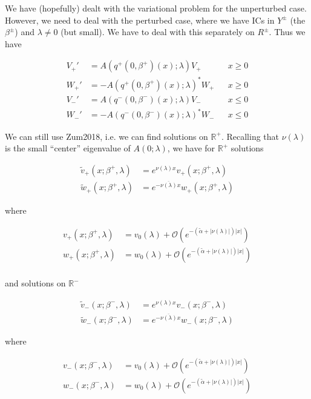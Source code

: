 \documentclass[12pt]{article}
\def\R{{\mathbb R}}
\begin{document}
We have (hopefully) dealt with the variational problem for the unperturbed case. However, we need to deal with the perturbed case, where we have ICs in $Y^\pm$ (the $\beta^\pm$) and $\lambda \neq 0$ (but small). We have to deal with this separately on $R^\pm$. Thus we have

\begin{align}
V_+' &= A(q^+(0, \beta^+)(x); \lambda) V_+ && x \geq 0 \label{eig:V+} \\
W_+' &= -A(q^+(0, \beta^+)(x); \lambda)^* W_+ && x \geq 0\label{eig:W+} \\
V_-' &= A(q^-(0, \beta^-)(x); \lambda) V_- && x \leq 0 \label{eig:V-} \\
W_-' &= -A(q^-(0, \beta^-)(x); \lambda)^* W_- && x \leq 0 \label{eig:W-}
\end{align}

We can still use Zum2018, i.e. we can find solutions on $\R^+$. Recalling that $\nu(\lambda)$ is the small ``center'' eigenvalue of $A(0; \lambda)$, we have for $\R^+$ solutions

\begin{align}
\tilde{v}_+(x; \beta^+, \lambda) &= e^{\nu(\lambda) x } v_+(x; \beta^+, \lambda) \label{tildev+} \\
\tilde{w}_+(x; \beta^+, \lambda) &= e^{-\overline{\nu(\lambda)} x } w_+(x; \beta^+, \lambda) \label{tildew+} 
\end{align}

where

\begin{align*}
v_+(x; \beta^+, \lambda) &= v_0(\lambda) + \mathcal{O}(e^{-(\tilde{\alpha} + |\nu(\lambda)|)|x|}) \\
w_+(x; \beta^+, \lambda) &= w_0(\lambda) + \mathcal{O}(e^{-(\tilde{\alpha} + |\nu(\lambda)|)|x|})\\
\end{align*}

and solutions on $\R^-$

\begin{align}
\tilde{v}_-(x; \beta^-, \lambda) &= e^{\nu(\lambda) x } v_-(x; \beta^-, \lambda) \label{tildev-} \\
\tilde{w}_-(x; \beta^-, \lambda) &= e^{-\overline{\nu(\lambda)} x } w_-(x; \beta^-, \lambda) \label{tildew-} 
\end{align}

where

\begin{align*}
v_-(x; \beta^-, \lambda) &= v_0(\lambda) + \mathcal{O}(e^{-(\tilde{\alpha} + |\nu(\lambda)|)|x|}) \\
w_-(x; \beta^-, \lambda) &= w_0(\lambda) + \mathcal{O}(e^{-(\tilde{\alpha} + |\nu(\lambda)|)|x|})\\
\end{align*}
\end{document}
